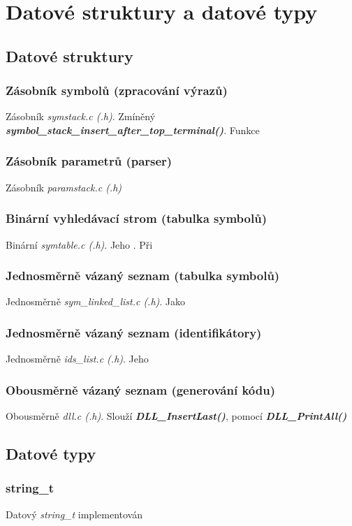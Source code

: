 \documentclass[a4paper, 12pt]{article}
\begin{document}
\section{Datové struktury a datové typy}
\subsection{Datové struktury}

\subsubsection{Zásobník symbolů (zpracování výrazů)}
Zásobník \textit{symstack.c (.h)}. Zmíněný \textit{\textbf{symbol\_stack\_insert\_after\_top\_terminal()}}. Funkce

\subsubsection{Zásobník parametrů (parser)}
Zásobník \textit{paramstack.c (.h)}

\subsubsection{Binární vyhledávací strom (tabulka symbolů)}
Binární \textit{symtable.c (.h)}. Jeho \cite{pruvodce2017}. Při 

\subsubsection{Jednosměrně vázaný seznam (tabulka symbolů)}
Jednosměrně \textit{sym\_linked\_list.c (.h)}. Jako

\subsubsection{Jednosměrně vázaný seznam (identifikátory)}
Jednosměrně \textit{ids\_list.c (.h)}. Jeho 

\subsubsection{Obousměrně vázaný seznam (generování kódu)}
Obousměrně \textit{dll.c (.h)}. Slouží \textit{\textbf{DLL\_InsertLast()}}, pomocí \textit{\textbf{DLL\_PrintAll()}}

\subsection{Datové typy}
\subsubsection{string\_t}
Datový \textit{string\_t} implementován
\end{document}
